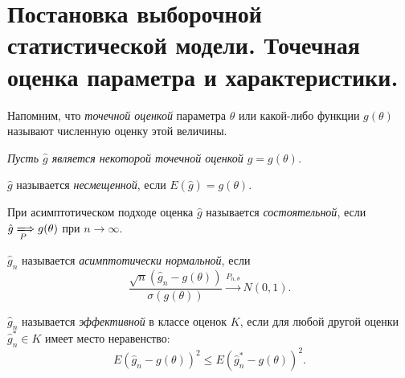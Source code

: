 \section{Постановка выборочной статистической модели. Точечная оценка параметра
  и характеристики.}

\begin{definition}
	Напомним, что \textit{точечной оценкой} параметра $\theta$ или какой-либо
	функции $g(\theta)$ называют численную оценку этой величины.
\end{definition}

\textit{Пусть $\hat{g}$ является некоторой точечной оценкой $g = g(\theta)$.}

\begin{definition}
	$\hat{g}$ называется \textit{несмещенной}, если $E(\hat{g}) = g(\theta).$
\end{definition}

\begin{definition}
	При асимптотическом подходе оценка $\hat{g}$ называется 
    \textit{состоятельной}, если $\hat{g} \xLongrightarrow[P]{} g(\theta)$ при 
    $n \to \infty$.
\end{definition}

\begin{definition}
	$\hat{g}_n$ называется \textit{асимптотически нормальной}, если
	\[
		\frac{\sqrt{n}(\hat{g}_n - g(\theta))}{\sigma(g(\theta))}
        \xrightarrow[]{P_{n, \theta}} N(0, 1)
	.\]
\end{definition}

\begin{definition}
	$\hat{g}_n$ называется \textit{эффективной} в классе оценок $K$, если для
	любой другой оценки $\hat{g}^*_n \in K$ имеет место неравенство:
	\[
		E(\hat{g}_n - g(\theta))^2 \leqslant E(\hat{g}^*_n - g(\theta))^2
	.\]
\end{definition}
